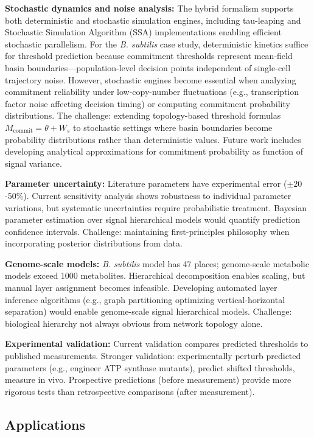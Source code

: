 \documentclass[10pt,letterpaper]{article}
\begin{document}
\textbf{Stochastic dynamics and noise analysis:} The hybrid formalism supports both deterministic and stochastic simulation engines, including tau-leaping and Stochastic Simulation Algorithm (SSA) implementations enabling efficient stochastic parallelism. For the \textit{B. subtilis} case study, deterministic kinetics suffice for threshold prediction because commitment thresholds represent mean-field basin boundaries---population-level decision points independent of single-cell trajectory noise. However, stochastic engines become essential when analyzing commitment reliability under low-copy-number fluctuations (e.g., transcription factor noise affecting decision timing) or computing commitment probability distributions. The challenge: extending topology-based threshold formulas $M_{\text{commit}} = \theta + W_s$ to stochastic settings where basin boundaries become probability distributions rather than deterministic values. Future work includes developing analytical approximations for commitment probability as function of signal variance.

\textbf{Parameter uncertainty:} Literature parameters have experimental error ($\pm 20$-50\%). Current sensitivity analysis shows robustness to individual parameter variations, but systematic uncertainties require probabilistic treatment. Bayesian parameter estimation over signal hierarchical models would quantify prediction confidence intervals. Challenge: maintaining first-principles philosophy when incorporating posterior distributions from data.

\textbf{Genome-scale models:} \textit{B. subtilis} model has 47 places; genome-scale metabolic models exceed 1000 metabolites. Hierarchical decomposition enables scaling, but manual layer assignment becomes infeasible. Developing automated layer inference algorithms (e.g., graph partitioning optimizing vertical-horizontal separation) would enable genome-scale signal hierarchical models. Challenge: biological hierarchy not always obvious from network topology alone.

\textbf{Experimental validation:} Current validation compares predicted thresholds to published measurements. Stronger validation: experimentally perturb predicted parameters (e.g., engineer ATP synthase mutants), predict shifted thresholds, measure in vivo. Prospective predictions (before measurement) provide more rigorous tests than retrospective comparisons (after measurement).

\subsection{Applications}
\end{document}
